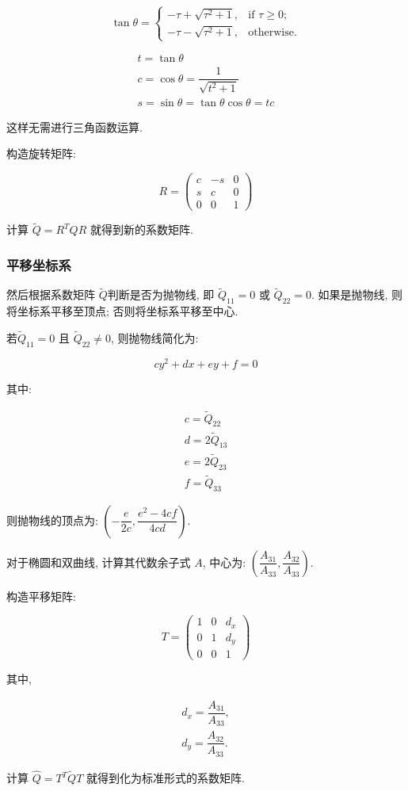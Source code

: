 \[
  \tan\theta = \begin{cases}
    - \tau + \sqrt{\tau^2+1}, & \text{if } \tau \geq 0;\\
    - \tau - \sqrt{\tau^2+1}, & \text{otherwise}.
  \end{cases}
\]

\begin{gather*}
  t = \tan\theta\\
  c = \cos\theta = \dfrac{1}{\sqrt{t^2+1}}\\
  s = \sin\theta = \tan\theta \cos\theta = tc
\end{gather*}

这样无需进行三角函数运算.

构造旋转矩阵:

\[
  R =
  \begin{pmatrix}
    c & -s & 0\\
    s & c & 0\\
    0 & 0 & 1
  \end{pmatrix}
\]

计算 $\tilde{Q}=R^TQR$ 就得到新的系数矩阵.

\subsubsection{平移坐标系}

然后根据系数矩阵 $\tilde{Q}$判断是否为抛物线, 即 $\tilde{Q}_{11} = 0$ 或 $\tilde{Q}_{22} = 0$. 如果是抛物线,
则将坐标系平移至顶点; 否则将坐标系平移至中心.

若$\tilde{Q}_{11} = 0$ 且 $\tilde{Q}_{22} \neq 0$, 则抛物线简化为:

\[
  cy^2+dx+ey+f=0
\] 

其中:

\begin{gather*}
  c = \tilde{Q}_{22}\\
  d = 2\tilde{Q}_{13}\\
  e = 2\tilde{Q}_{23}\\
  f = \tilde{Q}_{33}
\end{gather*}

则抛物线的顶点为: $\left(-\dfrac{e}{2c},\dfrac{e^2-4cf}{4cd}\right)$.

对于椭圆和双曲线, 计算其代数余子式 $A$,
中心为: $\left(\dfrac{A_{31}}{A_{33}},\dfrac{A_{32}}{A_{33}}\right)$.

构造平移矩阵:

\[
  T =
  \begin{pmatrix}
    1 & 0 & d_x\\
    0 & 1 & d_y\\
    0 & 0 & 1
  \end{pmatrix}
\]

其中,

\begin{gather*}
  d_x = \dfrac{A_{31}}{A_{33}},\\
  d_y = \dfrac{A_{32}}{A_{33}}.
\end{gather*}

计算 $\hat{Q}=T^T\tilde{Q}T$ 就得到化为标准形式的系数矩阵.

